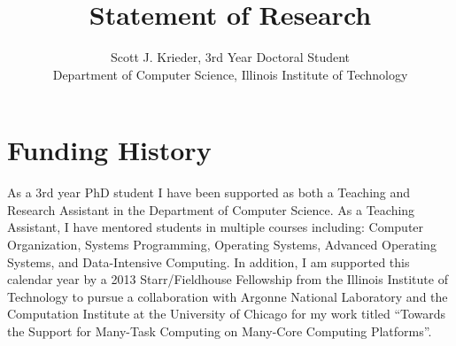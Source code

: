 \documentclass[conference]{IEEEtran}
\begin{document}
%
\title{Statement of Research}


\author{Scott J. Krieder, 3rd Year Doctoral Student\\
Department of Computer Science, Illinois Institute of Technology}

\maketitle


\IEEEpeerreviewmaketitle

\section{Funding History}
As a 3rd year PhD student I have been supported as both a Teaching and Research Assistant in the Department of Computer Science. As a Teaching Assistant, I have mentored students in multiple courses including: Computer Organization, Systems Programming, Operating Systems, Advanced Operating Systems, and Data-Intensive Computing. In addition, I am supported this calendar year by a 2013 Starr/Fieldhouse Fellowship \cite{Starr} from the Illinois Institute of Technology to pursue a collaboration with Argonne National Laboratory and the Computation Institute at the University of Chicago for my work titled ``Towards the Support for Many-Task Computing on Many-Core Computing Platforms''. \cite{kriederGCASR12}\cite{kriederXSEDE12}\cite{kriederSC12}\cite{grimmerEUROSYS13}
\end{document}
